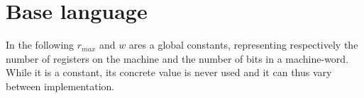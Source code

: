 \section{Base language}

In the following $r_{max}$ and $w$ ares a global constants, representing
respectively the number of registers on the machine and the number of bits in a
machine-word. While it is a constant, its concrete value is never used and it
can thus vary between implementation.
\\



